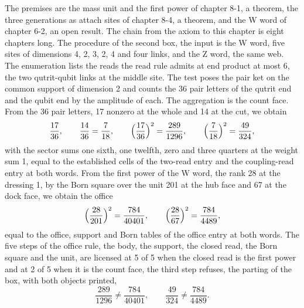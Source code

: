 \begin{chproof}
The premises are the mass unit and the first power of chapter 8-1, a theorem, the three generations as attach sites of chapter 8-4, a theorem, and the W word of chapter 6-2, an open result. The chain from the axiom to this chapter is eight chapters long. The procedure of the second box, the input is the W word, five sites of dimensions 4, 2, 3, 2, 4 and four links, and the Z word, the same web. The enumeration lists the reads the read rule admits at end product at most 6, the two qutrit-qubit links at the middle site. The test poses the pair ket on the common support of dimension 2 and counts the 36 pair letters of the qutrit end and the qubit end by the amplitude of each. The aggregation is the count face. From the 36 pair letters, 17 nonzero at the whole and 14 at the cut, we obtain
\begin{equation}
\frac{17}{36}, \qquad \frac{14}{36} = \frac{7}{18}, \qquad \Bigl(\frac{17}{36}\Bigr)^{2} = \frac{289}{1296}, \qquad \Bigl(\frac{7}{18}\Bigr)^{2} = \frac{49}{324} ,
\end{equation}
with the sector sums one sixth, one twelfth, zero and three quarters at the weight sum 1, equal to the established cells of the two-read entry and the coupling-read entry at both words. From the first power of the W word, the rank 28 at the dressing 1, by the Born square over the unit 201 at the hub face and 67 at the dock face, we obtain the office
\begin{equation}
\Bigl(\frac{28}{201}\Bigr)^{2} = \frac{784}{40401}, \qquad \Bigl(\frac{28}{67}\Bigr)^{2} = \frac{784}{4489} ,
\end{equation}
equal to the office, support and Born tables of the office entry at both words. The five steps of the office rule, the body, the support, the closed read, the Born square and the unit, are licensed at 5 of 5 when the closed read is the first power and at 2 of 5 when it is the count face, the third step refuses, the parting of the box, with both objects printed,
\begin{equation}
\frac{289}{1296} \neq \frac{784}{40401}, \qquad \frac{49}{324} \neq \frac{784}{4489} .
\end{equation}


\end{chproof}
